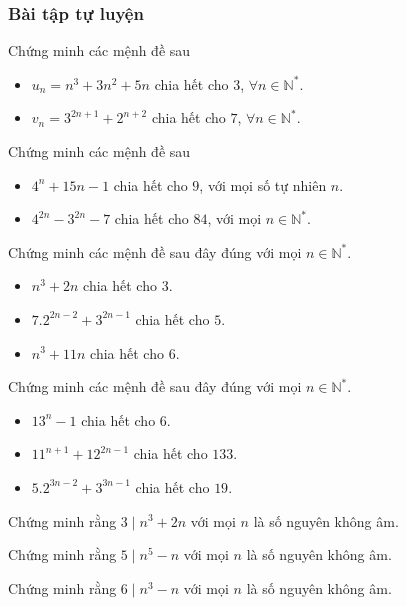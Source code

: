 \subsubsection*{Bài tập tự luyện}
\setcounter{bai}{0}
\begin{bai}
	Chứng minh các mệnh đề sau
	\begin{itemize}
		\item  $u_n=n^3+3n^2+5n$ chia hết cho $3$, $\forall n\in \mathbb{N}^*$. 
		\item $v_n=3^{2n+1}+2^{n+2}$ chia hết cho $7$, $\forall n\in \mathbb{N}^*$.
	\end{itemize}
\end{bai}
\begin{bai}
	Chứng minh các mệnh đề sau
	\begin{itemize}
		\item  $4^n+15n-1$ chia hết cho $9$, với mọi số tự nhiên $n$.
		\item   $4^{2n}-3^{2n}-7$ chia hết cho $84$, với mọi $n\in \mathbb{N}^*$.
	\end{itemize}
\end{bai}
\begin{bai}
	Chứng minh các mệnh đề sau đây đúng với mọi $n\in \mathbb{N}^*$.
	\begin{itemize}
		\item  $n^3+2n$ chia hết cho $3$.
		\item  $7.2^{2n-2}+3^{2n-1}$ chia hết cho $5$.
		\item  $n^3+11n$ chia hết cho $6$.
	\end{itemize}
\end{bai}
\begin{bai}
	Chứng minh các mệnh đề sau đây đúng với mọi $n\in \mathbb{N}^*$.
	\begin{itemize}
		\item  $13^n-1$ chia hết cho $6$.
		\item   $11^{n+1}+12^{2n-1}$ chia hết cho $133$.
		\item  $5.2^{3n-2}+3^{3n-1}$ chia hết cho $19$.
	\end{itemize}
\end{bai}
\begin{bai}
	Chứng minh rằng $3 \mid n^3+2n$ với mọi $n$ là số nguyên không âm.
\end{bai}
\begin{bai}
	Chứng minh rằng $5 \mid n^5-n$ với mọi $n$ là số nguyên không âm.
\end{bai}
\begin{bai}
	Chứng minh rằng $6 \mid n^3-n$ với mọi $n$ là số nguyên không âm.
\end{bai}
